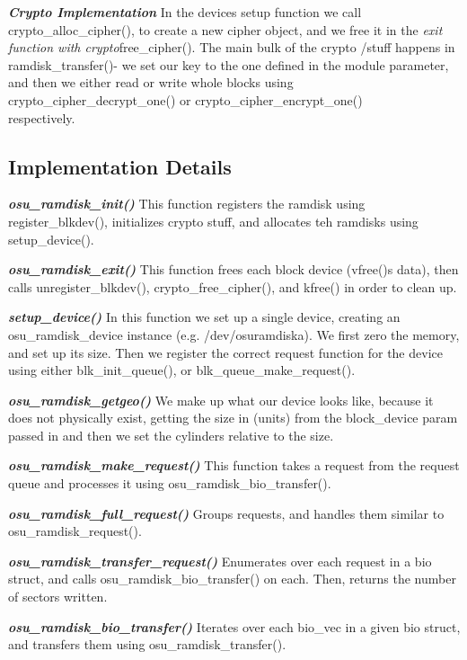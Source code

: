 \textbf{\emph{Crypto Implementation}} In the devices setup function we
call crypto\_alloc\_cipher(), to create a new cipher object, and we free
it in the \emph{exit function with crypto}free\_cipher(). The main bulk
of the crypto /stuff happens in ramdisk\_transfer()- we set our key to
the one defined in the module parameter, and then we either read or
write whole blocks using crypto\_cipher\_decrypt\_one() or
crypto\_cipher\_encrypt\_one()\\respectively.

\subsection{Implementation Details}

\textbf{\emph{osu\_ramdisk\_init()}} This function registers the ramdisk
using register\_blkdev(), initializes crypto stuff, and allocates teh
ramdisks using setup\_device().

\textbf{\emph{osu\_ramdisk\_exit()}} This function frees each block
device (vfree()s data), then calls unregister\_blkdev(),
crypto\_free\_cipher(), and kfree() in order to clean up.

\textbf{\emph{setup\_device()}} In this function we set up a single
device, creating an osu\_ramdisk\_device instance (e.g.
/dev/osuramdiska). We first zero the memory, and set up its size. Then
we register the correct request function for the device using either
blk\_init\_queue(), or blk\_queue\_make\_request().

\textbf{\emph{osu\_ramdisk\_getgeo()}} We make up what our device looks
like, because it does not physically exist, getting the size in (units)
from the block\_device param passed in and then we set the cylinders
relative to the size.

\textbf{\emph{osu\_ramdisk\_make\_request()}} This function takes a
request from the request queue and processes it using
osu\_ramdisk\_bio\_transfer().

\textbf{\emph{osu\_ramdisk\_full\_request()}} Groups requests, and
handles them similar to osu\_ramdisk\_request().

\textbf{\emph{osu\_ramdisk\_transfer\_request()}} Enumerates over each
request in a bio struct, and calls osu\_ramdisk\_bio\_transfer() on
each. Then, returns the number of sectors written.

\textbf{\emph{osu\_ramdisk\_bio\_transfer()}} Iterates over each
bio\_vec in a given bio struct, and transfers them using
osu\_ramdisk\_transfer().

